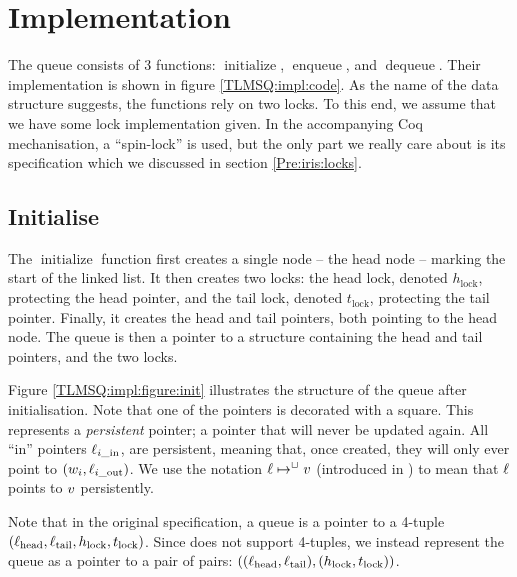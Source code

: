 \documentclass[a4paper, 10pt]{report}
\theoremstyle{definition}
\newcommand{\initialise}{\operatorname{initialize}}
\newcommand{\enqueue}{\operatorname{enqueue}}
\newcommand{\dequeue}{\operatorname{dequeue}}
\newcommand{\locinM}[1]{\loc_{#1\_\mathrm{in}}}
\newcommand{\locoutM}[1]{\loc_{#1\_\mathrm{out}}}
\newcommand{\locN}[1]{\loc_{\mathrm{#1}}}
\newcommand{\lochead}{\locN{head}}
\newcommand{\loctail}{\locN{tail}}
\newcommand{\nodeval}{\valB}
\newcommand{\nodevalM}[1]{\nodeval_{#1}}
\newcommand{\Hlock}{h_{\mathrm{lock}}}
\newcommand{\Tlock}{t_{\mathrm{lock}}}
\begin{document}
\section{Implementation}
\label{TLMSQ:section:implementation}

The queue consists of 3 functions: $\initialise$, $\enqueue$, and $\dequeue$. Their implementation is shown in figure \ref{TLMSQ:impl:code}. As the name of the data structure suggests, the functions rely on two locks. To this end, we assume that we have some lock implementation given. In the accompanying Coq mechanisation, a ``spin-lock'' is used, but the only part we really care about is its specification which we discussed in section \ref{Pre:iris:locks}.

\subsection{Initialise}
\label{TLMSQ:implementation:sub:initialise}

The $\initialise$ function first creates a single node -- the head node -- marking the start of the linked list. It then creates two locks: the head lock, denoted $\Hlock$, protecting the head pointer, and the tail lock, denoted $\Tlock$, protecting the tail pointer. Finally, it creates the head and tail pointers, both pointing to the head node. The queue is then a pointer to a structure containing the head and tail pointers, and the two locks.

Figure \ref{TLMSQ:impl:figure:init} illustrates the structure of the queue after initialisation. Note that one of the pointers is decorated with a square. This represents a \emph{persistent} pointer; a pointer that will never be updated again. All ``in'' pointers $\locinM{i}$, are persistent, meaning that, once created, they will only ever point to $(\nodevalM{i}, \locoutM{i})$. We use the notation $\ell \mapsto^{\mathop{\Box}} v$ (introduced in \citet{DBLP:conf/cpp/VindumB21}) to mean that $\ell$ points to $v$ persistently.

Note that in the original specification, a queue is a pointer to a 4-tuple $(\lochead, \loctail, \Hlock, \Tlock)$. Since \heaplang does not support 4-tuples, we instead represent the queue as a pointer to a pair of pairs: $\left((\lochead, \loctail), (\Hlock, \Tlock)\right)$.
\end{document}
